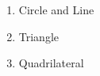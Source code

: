 

\begin{enumerate}
    \normalsize \item Circle and Line \par
        \small 
    \normalsize \item Triangle \par
        \small  \columnbreak
    \normalsize \item Quadrilateral \par
        \small 
\end{enumerate}